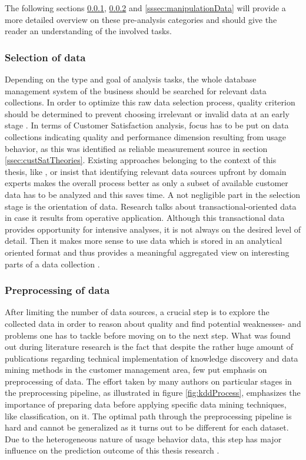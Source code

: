 The following sections \ref{sssec:selectionData}, \ref{sssec:explorationData} and \ref{sssec:manipulationData} will provide a more detailed overview on these pre-analysis categories and should give the reader an understanding of the involved tasks. 

\subsubsection{Selection of data}
\label{sssec:selectionData}
Depending on the type and goal of analysis tasks, the whole database management system of the business should be searched for relevant data collections. In order to optimize this raw data selection process, quality criterion should be determined to prevent choosing irrelevant or invalid data at an early stage \cite{mozer2000predicting} \cite{fayyad1996data}. In terms of Customer Satisfaction analysis, focus has to be put on data collections indicating quality and performance dimension resulting from usage behavior, as this was identified as reliable measurement source in section \ref{ssec:custSatTheories}. Existing approaches belonging to the context of this thesis, like \cite{mozer2000predicting}, \cite{meinzer2016can} or \cite{zhao2005customer} insist that identifying relevant data sources upfront by domain experts makes the overall process better as only a subset of available customer data has to be analyzed and this saves time. A not negligible part in the selection stage is the orientation of data. Research talks about transactional-oriented data in case it results from operative application. Although this transactional data provides opportunity for intensive analyses, it is not always on the desired level of detail. Then it makes more sense to use data which is stored in an analytical oriented format and thus provides a meaningful aggregated view on interesting parts of a data collection \cite{neckel2015}. 

\subsubsection{Preprocessing of data}
\label{sssec:explorationData}
After limiting the number of data sources, a crucial step is to explore the collected data in order to reason about quality and find potential weaknesses- and problems one has to tackle before moving on to the next step. What was found out during literature research is the fact that despite the rather huge amount of publications regarding technical implementation of knowledge discovery and data mining methods in the customer management area, few put emphasis on preprocessing of data. The effort taken by many authors on particular stages in the preprocessing pipeline, as illustrated in figure \ref{fig:kddProcess}, emphasizes the importance of preparing data before applying specific data mining techniques, like classification, on it. The optimal path through the preprocessing pipeline is hard and cannot be generalized as it turns out to be different for each dataset. Due to the heterogeneous nature of usage behavior data, this step has major influence on the prediction outcome of this thesis research \cite{fayyad1996data}. 

